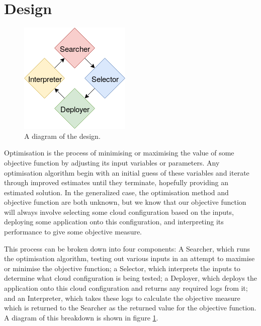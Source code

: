 \documentclass{article}
\begin{document}
\section{Design}
\begin{figure}[!ht]
  \centering
   \includegraphics[scale=0.8]{Design}
  \caption{A diagram of the design.}
  \label{fig:design}
\end{figure}

Optimisation is the process of minimising or maximising the value of some objective function by adjusting its input variables or parameters. Any optimisation algorithm begin with an initial guess of these variables and iterate through improved estimates until they terminate, hopefully providing an estimated solution. \cite{Nocedal2006} In the generalized case, the optimisation method and objective function are both unknown, but we know that our objective function will always involve selecting some cloud configuration based on the inputs, deploying some application onto this configuration, and interpreting its performance to give some objective measure.

This process can be broken down into four components: A Searcher, which runs the optimisation algorithm, testing out various inputs in an attempt to maximise or minimise the objective function; a Selector, which interprets the inputs to determine what cloud configuration is being tested; a Deployer, which deploys the application onto this cloud configuration and returns any required logs from it; and an Interpreter, which takes these logs to calculate the objective measure which is returned to the Searcher as the returned value for the objective function. A diagram of this breakdown is shown in figure \ref{fig:design}.
\end{document}
